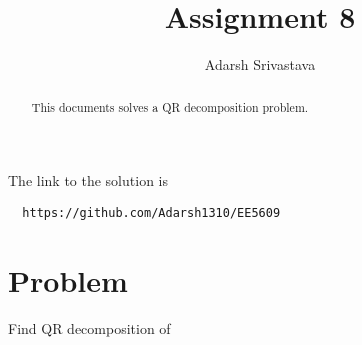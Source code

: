 \documentclass[journal,12pt,twocolumn]{IEEEtran}
\begin{document}
      \def\rightbox#1{\makebox[0in][r]{#1}}
      \def\centbox#1{\makebox[0in]{#1}}
      \def\topbox#1{\raisebox{-\baselineskip}[0in][0in]{#1}}
      \def\midbox#1{\raisebox{-0.5\baselineskip}[0in][0in]{#1}}
 \vspace{3cm}
 \title{Assignment 8}
 \author{Adarsh Srivastava}
 \maketitle
 \newpage
 \bigskip
 \renewcommand{\thetable}{\theenumi}
 The link to the solution is
 \begin{lstlisting}
  https://github.com/Adarsh1310/EE5609
 \end{lstlisting}
 \begin{abstract}
 This documents solves a QR decomposition problem.
 \end{abstract}
  \section{\textbf{Problem}}
Find QR decomposition of 
\end{document}
